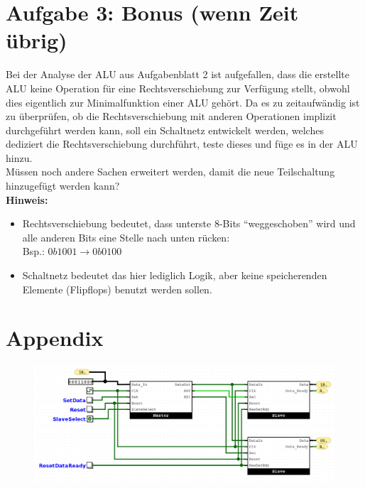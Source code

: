 \documentclass[a4paper]{scrartcl}
\begin{document}
\section*{Aufgabe 3: Bonus (wenn Zeit übrig)}
Bei der Analyse der ALU aus Aufgabenblatt 2 ist aufgefallen, dass die erstellte ALU keine Operation für eine 
Rechtsverschiebung zur Verfügung stellt, obwohl dies eigentlich zur Minimalfunktion einer ALU gehört. Da es 
zu zeitaufwändig ist zu überprüfen, ob die Rechtsverschiebung mit anderen Operationen implizit durchgeführt werden kann, 
soll ein Schaltnetz entwickelt werden, welches dediziert die Rechtsverschiebung durchführt, teste dieses und füge es in der ALU hinzu.\\
Müssen noch andere Sachen erweitert werden, damit die neue Teilschaltung hinzugefügt werden kann?
\\

\textbf{Hinweis:} 
\begin{itemize}
  \item Rechtsverschiebung bedeutet, dass unterste 8-Bits ``weggeschoben'' wird und alle anderen Bits eine Stelle nach unten rücken:\\
  Bsp.: $0b1001 \rightarrow 0b0100$
  \item Schaltnetz bedeutet das hier lediglich Logik, aber keine speicherenden Elemente (Flipflops) benutzt werden sollen.
\end{itemize}

\section*{Appendix}
\begin{figure}[h]
  \centering
  \includegraphics[width=\textwidth]{Assembly.png}
\end{figure}

  
\end{document}
